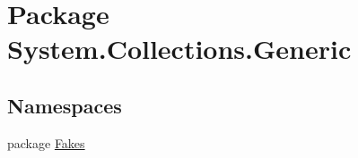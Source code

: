 \hypertarget{namespace_system_1_1_collections_1_1_generic}{\section{Package System.\-Collections.\-Generic}
\label{namespace_system_1_1_collections_1_1_generic}
}
\subsection*{Namespaces}
\begin{DoxyCompactItemize}
\item 
package \hyperlink{namespace_system_1_1_collections_1_1_generic_1_1_fakes}{Fakes}
\end{DoxyCompactItemize}
